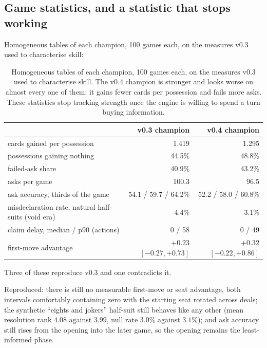 \documentclass[11pt,letterpaper]{article}
\begin{document}
\subsection{Game statistics, and a statistic that stops working}
\label{sec:res-analytics}

Homogeneous tables of each champion, 100 games each, on the measures v0.3 used
to characterise skill:

\begin{table}[t]
\centering
\small
\begin{tabular}{lrr}
\toprule
& v0.3 champion & v0.4 champion \\
\midrule
cards gained per possession & 1.419 & 1.295 \\
possessions gaining nothing & 44.5\% & 48.8\% \\
failed-ask share & 40.9\% & 43.2\% \\
asks per game & 100.3 & 96.5 \\
ask accuracy, thirds of the game & 54.1 / 59.7 / 64.2\% & 52.2 / 58.0 / 60.8\% \\
misdeclaration rate, natural half-suits (void era) & 4.4\% & 3.1\% \\
claim delay, median / p90 (actions) & 0 / 58 & 0 / 49 \\
first-move advantage & $+0.23$ $[-0.27, +0.73]$ & $+0.32$ $[-0.22, +0.86]$ \\
\bottomrule
\end{tabular}
\caption{Homogeneous tables of each champion, 100 games each, on the measures v0.3 used to characterise skill. The v0.4 champion is stronger and looks worse on almost every one of them: it gains fewer cards per possession and fails more asks. These statistics stop tracking strength once the engine is willing to spend a turn buying information.}
\label{tab:analytics}
\end{table}

Three of these reproduce v0.3 and one contradicts it.

Reproduced: there is still no measurable first-move or seat advantage, both
intervals comfortably containing zero with the starting seat rotated across
deals; the synthetic ``eights and jokers'' half-suit still behaves like any
other (mean resolution rank $4.08$ against $3.99$, null rate $3.0\%$ against
$3.1\%$); and ask accuracy still rises from the opening into the later game,
so the opening remains the least-informed phase.
\end{document}
